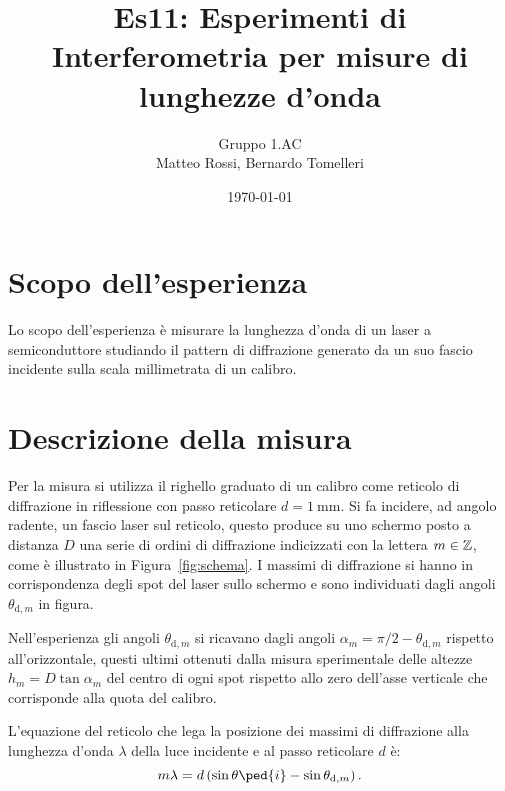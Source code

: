 \documentclass[10pt, a4paper, italian]{article}
\author{Gruppo 1.AC \\ Matteo Rossi, Bernardo Tomelleri}
\title{Es11: Esperimenti di Interferometria per misure di lunghezze d'onda}
\begin{document}
\date{\today}
\maketitle

\section{Scopo dell'esperienza}
Lo scopo dell'esperienza è misurare la lunghezza d'onda di un laser
a semiconduttore studiando il pattern di diffrazione generato da un suo
fascio incidente sulla scala millimetrata di un calibro.

\section{Descrizione della misura}
Per la misura si utilizza il righello graduato di un calibro come reticolo di diffrazione in riflessione con passo reticolare $ d = \SI{1}{\milli\meter} $.  Si fa incidere, ad angolo radente, un fascio laser sul reticolo, questo produce su uno schermo posto a distanza $ D $ una serie di ordini di diffrazione indicizzati con la lettera $m \in \mathbb Z$, come è illustrato in Figura~\ref{fig:schema}. I massimi di diffrazione si hanno in corrispondenza degli spot del laser sullo schermo e sono individuati dagli angoli $\theta_{\mathrm{d},m}$ in figura.

Nell'esperienza gli angoli $\theta_{\mathrm{d},m}$ si ricavano dagli angoli $\alpha_m = \pi/2 - \theta_{\mathrm{d},m}$ rispetto all'orizzontale, questi ultimi ottenuti dalla misura sperimentale delle altezze $h_m = D \tan\alpha_m$ del centro di ogni spot rispetto allo zero dell'asse verticale che corrisponde alla quota del calibro.

L'equazione del reticolo che lega la posizione dei massimi di diffrazione alla lunghezza d'onda $\lambda$ della luce incidente e al passo reticolare $d$ è:
\begin{equation}\label{eq:fit}
    m \lambda = d \left(\sin{\theta\ped{i}} - \sin{\theta_{\mathrm{d},m}}\right).
\end{equation}
\end{document}
